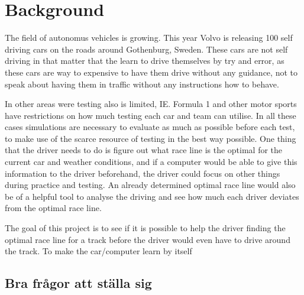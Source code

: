 
\chapter{Background}
The field of autonomus vehicles is growing. This year Volvo is releasing 100 self driving cars on the roads around Gothenburg, Sweden. These cars are not self driving in that matter that the learn to drive themselves by try and error, as these cars are way to expensive to have them drive without any guidance, not to speak about having them in traffic without any instructions how to behave. 

In other areas were testing also is limited, IE. Formula 1 and other motor sports have restrictions on how much testing each car and team can utilise. In all these cases simulations are necessary to evaluate as much as possible before each test, to make use of the scarce resource of testing in the best way possible. One thing that the driver needs to do is figure out what race line is the optimal for the current car and weather conditions, and if a computer would be able to give this information to the driver beforehand, the driver could focus on other things during practice and testing. An already determined optimal race line would also be of a helpful tool to analyse the driving and see how much each driver deviates from the optimal race line.

The goal of this project is to see if it is possible to help the driver finding the optimal race line for a track before the driver would even have to drive around the track. To make the car/computer learn by itself 



\section{Bra frågor att ställa sig}

